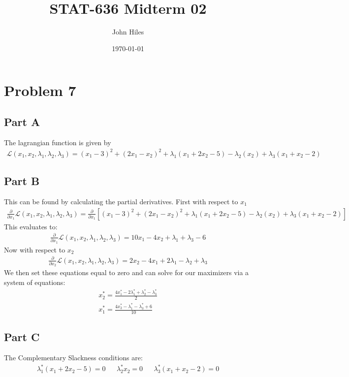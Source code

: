 \documentclass{article}
\title{STAT-636 Midterm 02}
\author{John Hiles}
\date\today
\begin{document}
\maketitle %
\section*{Problem 7}
\subsection*{Part A}
The lagrangian function is given by
\begin{align*}
\boxed{ \mathcal{L}(x_1,x_2,\lambda_1,\lambda_2,\lambda_3) = (x_1-3)^2 + (2x_1-x_2)^2 + \lambda_1 (x_1+2x_2-5) - \lambda_2 (x_2) + \lambda_3(x_1+x_2-2) }
\end{align*}
\subsection*{Part B}
This can be found by calculating the partial derivatives. First with respect to $x_1$
\begin{align*}
\frac{\partial}{\partial x_1}\mathcal{L}(x_1,x_2,\lambda_1,\lambda_2,\lambda_3) =\frac{\partial}{\partial x_1} [ (x_1-3)^2 + (2x_1-x_2)^2 + \lambda_1 (x_1+2x_2-5) - \lambda_2 (x_2) + \lambda_3(x_1+x_2-2) ]
\end{align*}
This evaluates to:
\begin{align*}
\frac{\partial}{\partial x_1}\mathcal{L}(x_1,x_2,\lambda_1,\lambda_2,\lambda_3) = 10x_1-4x_2 + \lambda_1+\lambda_3 - 6
\end{align*}
Now with respect to $x_2$
\begin{align*}
\frac{\partial}{\partial x_2}\mathcal{L}(x_1,x_2,\lambda_1,\lambda_2,\lambda_3) = 2x_2-4x_1+2\lambda_1 -\lambda_2 + \lambda_3
\end{align*}
We then set these equations equal to zero and can solve for our maximizers via a system of equations:
\begin{align*}
\boxed{ x_2^* = \frac{ 4x_1^*-2\lambda_1^* +\lambda_2^* - \lambda_3^*}{2} } \\
\boxed{ x_1^* = \frac{4x_2^* - \lambda_1^* - \lambda_3^* + 6}{10} }
\end{align*}

\subsection*{Part C}
The Complementary Slackness conditions are:
\begin{align*}
\boxed{ \lambda^*_1(x_1+2x_2-5) = 0 } && \boxed{ \lambda^*_2 x_2 = 0 } && \boxed{ \lambda^*_3(x_1+x_2-2) = 0 }
\end{align*}
\end{document}
